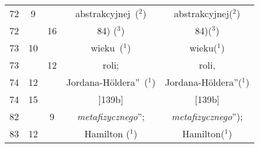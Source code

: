 \documentclass[a4paper,11pt]{article}
\numberwithin{equation}{section}
\begin{document}
\begin{center}
\begin{tabular}{|c|c|c|c|c|}
    72 & \hphantom{0}9 & & abstrakcyjnej~($^{ 2 }$)
    & abstrakcyjnej($^{ 2 }$) \\
    72 & & 16 & 84) ($^{ 3 }$) & 84)($^{ 3 }$) \\
    73 & 10 & & wieku~($^{ 1 }$) & wieku($^{ 1 }$) \\
    73 & & 12 & roli; & roli, \\
    74 & 12 & & Jordana-H\"{o}ldera”~($^{ 1 }$)
    & Jordana-H\"{o}ldera”($^{ 1 }$) \\
    74 & 15 & & ]139b] & [139b] \\
    82 & & \hphantom{0}9 & \textit{metafizycznego}”;
    & \textit{metafizycznego}”); \\
    83 & 12 & & Hamilton ($^{ 1 }$) & Hamilton($^{ 1 }$) \\
    \hline
  \end{tabular}





  \newpage


\end{center}
\end{document}
